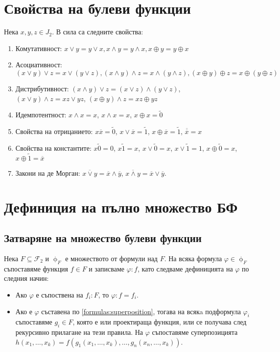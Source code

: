 \documentclass[fleqn,12pt]{article}
\begin{document}
\begin{flushleft}
\section{Свойства на булеви функции}

Нека $x,y,z \in J_2$. В сила са следните свойства:
\begin{enumerate}
    \item Комутативност: $x \vee y = y \vee x, x \wedge y = y \wedge x, x \oplus y = y \oplus x$
    \item Асоциативност: $(x \vee y) \vee z = x \vee (y \vee z), (x \wedge y) \wedge z = x \wedge (y \wedge z), (x \oplus y) \oplus z = x \oplus (y \oplus z)$
    \item Дистрибутивност: $(x \wedge y) \vee z = (x \vee z) \wedge (y \vee z)$, $(x \vee y) \wedge z = xz \vee yz$, $(x \oplus y) \wedge z = xz \oplus yz$
    \item Идемпотентност: $x \wedge x = x$, $x \wedge x = x$, $x \oplus x = \widetilde{0}$
    \item Свойства на отрицанието: $x\overline{x} = \widetilde{0}$, $x \vee \overline{x} = \widetilde{1}$, $x \oplus \overline{x} = \widetilde{1}$, $\overline{\overline{{x}}} = x$
    \item Свойства на константите: $x\widetilde{0} = 0$, $x\widetilde{1} = x$, $x\vee \widetilde{0} = x$, $x \vee \widetilde{1} = 1$, $x \oplus \widetilde{0} = x$, $x \oplus \widetilde{1} = \overline{x}$
    \item Закони на де Морган: $\overline{x \vee y} = \overline{x} \wedge \overline{y}$, $\overline{x \wedge y} = \overline{x} \vee \overline{y}$.  
\end{enumerate}


\section{Дефиниция на пълно множество БФ}
\subsection{Затваряне на множество булеви функции}
Нека $F \subseteq \mathcal{F}_2$ и $\upphi_F$ е множеството от формули над $F$.
На всяка формула $\varphi \in \upphi_F$ съпоставяме функция $f \in F$ и записваме $\varphi : f$, като 
следваме дефиницията на $\varphi$ по следния начин:
\begin{itemize}
    \item Ако $\varphi$ е съпоствена на $f_i : F$, то $\varphi : f = f_i$.
    \item Ако е $\varphi$ съставена по \ref{formulas:superposition}, тогава на всякa подформула $\varphi_i$ съпоставяме $g_i \in F$, 
    която е или проектираща функция, или се получава след рекурсивно прилагане на тези правила. На $\varphi$ съпоставяме 
    суперпозицията $h(x_1, \dots, x_k) = f(g_1(x_1, \dots, x_k), \dots, g_n(x_n, \dots, x_k))$.
\end{itemize}


\end{flushleft}
\end{document}
